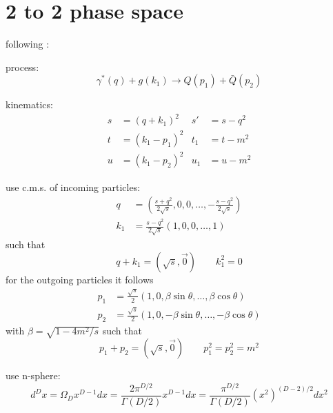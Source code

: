 \documentclass[
  english,		%
  a4paper,		%
  11pt,			%
  DIV=12,
  titlepage,
  toc=bibnumbered,
  parskip=full,  	%
  headings=normal,
  BCOR=12mm,
  numbers=noenddot
]{scrartcl}
\begin{document}
\section{2 to 2 phase space}
following \cite{Marco}:

process:
\begin{equation}
\gamma^*(q) + g(k_1) \rightarrow Q(p_1)+\bar{Q}(p_2)
\end{equation}

kinematics:
\begin{align}
s &= (q+k_1)^2 &s' &=s-q^2\\
t &= (k_1-p_1)^2 &t_1 &= t-m^2\\
u &= (k_1-p_2)^2 &u_1 &= u-m^2
\end{align}

use c.m.s. of incoming particles:
\begin{align}
q &= \left(\frac {s+q^2}{2\sqrt s},0,0,\ldots,-\frac{s-q^2}{2\sqrt s}\right) \\
k_1 &= \frac {s-q^2}{2\sqrt s}\left(1,0,0,\ldots,1\right)
\end{align}
such that
\begin{equation}
q+k_1 = (\sqrt s,\vec 0)\qquad k_1^2 = 0
\end{equation}
for the outgoing particles it follows
\begin{align}
p_1 &= \frac{\sqrt s} 2 \left(1,0,\beta\sin\theta,\ldots,\beta\cos\theta\right)\\
p_2 &= \frac{\sqrt s} 2 \left(1,0,-\beta\sin\theta,\ldots,-\beta\cos\theta\right)
\end{align}
with $\beta = \sqrt{1-4m^2/s}$ such that
\begin{equation}
p_1+p_2 = (\sqrt s,\vec 0)\qquad p_1^2 = p_2^2 = m^2
\end{equation}

use n-sphere:
\begin{equation}
d^Dx = \Omega_D x^{D-1} dx = \frac{2\pi^{D/2}}{\Gamma(D/2)}x^{D-1} dx= \frac{\pi^{D/2}}{\Gamma(D/2)}(x^2)^{(D-2)/2} dx^2
\end{equation}
\end{document}
